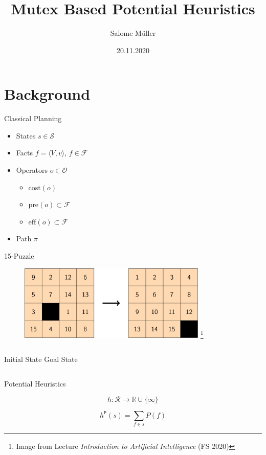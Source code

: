 \documentclass[aspectratio=169, xcolor=dvipsnames]{beamer}
\title              {Mutex Based Potential Heuristics}
\author             {Salome M\"uller}
\institute          {Department of Mathematics and Computer Science, University of Basel}
\date               {20.11.2020}
\begin{document}
    \begin{frame}[t,plain]
        \titlepage
    \end{frame}

    \section{Background}
    \begin{frame}[c]{Classical Planning}
        \begin{itemize}
            \item States $s\in\mathcal{S}$
            \item Facts $f = \langle V, v  \rangle$, $f\in\mathcal{F}$
            \item Operators $o\in\mathcal{O}$
            \begin{itemize}
                \item $\text{cost}(o)$
                \item $\text{pre}(o)\subset\mathcal{F}$
                \item $\text{eff}(o)\subset\mathcal{F}$
            \end{itemize}
            \item Path $\pi$
        \end{itemize}
    \end{frame}

    \begin{frame}[c]{15-Puzzle}
        \begin{figure}
            \includegraphics[width=0.8\textwidth]{15-puzzle}
            \footnote{Image from Lecture \textit{Introduction to Artificial Intelligence} (FS 2020)}
        \end{figure}
        \begin{columns}[c]
            \center Initial State
            \center Goal State
        \end{columns}
    \end{frame}

    \begin{frame}[c]{Potential Heuristics}
        \begin{definition}
            \[h:\mathcal{R} \rightarrow \mathbb{R} \cup \{\infty\}\]
        \end{definition}

        \begin{definition}
            \[h^\mathtt{P}(s)=\sum_{f\in s}P(f)\]
        \end{definition}
    \end{frame}
\end{document}

